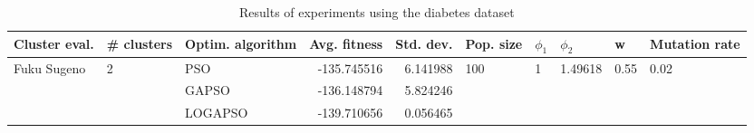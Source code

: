 \begin{table}
\centering
\caption{Results of experiments using the diabetes dataset}
\begin{tabular}{lllrrlllll}
\toprule
               Cluster eval. &        \# clusters & Optim. algorithm &  Avg. fitness &  Std. dev. &            Pop. size &         $\phi_{1}$ &               $\phi_{2}$ &                     w &         Mutation rate \\
\midrule
\multirow{3}{*}{Fuku Sugeno} & \multirow{3}{*}{2} &              PSO &   -135.745516 &   6.141988 & \multirow{3}{*}{100} & \multirow{3}{*}{1} & \multirow{3}{*}{1.49618} & \multirow{3}{*}{0.55} & \multirow{3}{*}{0.02} \\
                             &                    &            GAPSO &   -136.148794 &   5.824246 &                      &                    &                          &                       &                       \\
                             &                    &          LOGAPSO &   -139.710656 &   0.056465 &                      &                    &                          &                       &                       \\
\bottomrule
\end{tabular}
\end{table}
